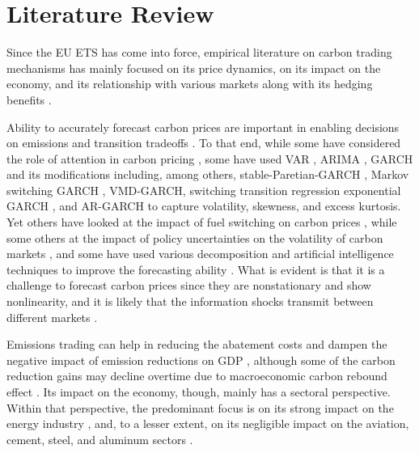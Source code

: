 \documentclass[preprint, 3p,
authoryear]{elsarticle} %
\begin{document}
\hypertarget{literature-review}{%
\section{Literature Review}\label{literature-review}}

Since the EU ETS has come into force, empirical literature on carbon
trading mechanisms has mainly focused on its price dynamics, on its
impact on the economy, and its relationship with various markets along
with its hedging benefits
\citep{demiralay_carbon_2022, dai_impact_2022}.

Ability to accurately forecast carbon prices are important in enabling
decisions on emissions and transition tradeoffs
\citep{wang_novel_2021, zhang_forecasting_2024, chen_multiscale_2024}.
To that end, while some have considered the role of attention in carbon
pricing
\citep{zheng_relationship_2022, gong_climate_2023, zhang_forecasting_2024},
some have used VAR \citep{arouri_nonlinearities_2012}, ARIMA
\citep{garcia-martos_modelling_2013}, GARCH
\citep{byun_forecasting_2013} and its modifications including, among
others, stable-Paretian-GARCH \citep{paolella_econometric_2008}, Markov
switching GARCH \citep{benz_modeling_2009},
VMD-GARCH\citep{huang_hybrid_2021}, switching transition regression
exponential GARCH \citep{arouri_nonlinearities_2012}, and AR-GARCH
\citep{benz_modeling_2009} to capture volatility, skewness, and excess
kurtosis. Yet others have looked at the impact of fuel switching on
carbon prices
\citep{bertrand_carbon_2014, hintermann_allowance_2010, pettersson_fuel_2012},
while some others at the impact of policy uncertainties on the
volatility of carbon markets \citep{dai_impact_2022, dong_extreme_2024},
and some have used various decomposition and artificial intelligence
techniques to improve the forecasting ability
\citep{QIN2024131410, wang_novel_2021, chen_multiscale_2024}. What is
evident is that it is a challenge to forecast carbon prices since they
are nonstationary and show nonlinearity, and it is likely that the
information shocks transmit between different markets
\citep{feng_carbon_2011, lutz_nonlinearity_2013, segnon_modeling_2017, chen_multiscale_2024}.

Emissions trading can help in reducing the abatement costs and dampen
the negative impact of emission reductions on GDP
\citep{wu_achieving_2016, lin_impacts_2019}, although some of the carbon
reduction gains may decline overtime due to macroeconomic carbon rebound
effect \citep{bolat_is_2023}. Its impact on the economy, though, mainly
has a sectoral perspective. Within that perspective, the predominant
focus is on its strong impact on the energy industry
\citep{delarue_simulating_2007, kara_impacts_2008, zachmann_first_2008, kirat_impact_2011, bonenti_evaluating_2013, hobbie_windfall_2019, hanif_nonlinear_2021, dai_impact_2022},
and, to a lesser extent, on its negligible impact on the aviation,
cement, steel, and aluminum sectors
\citep{VANASSELT2007497, zhang_overview_2010, oberndorfer_costs_2007, efthymiou_eu_2019}.
\end{document}
